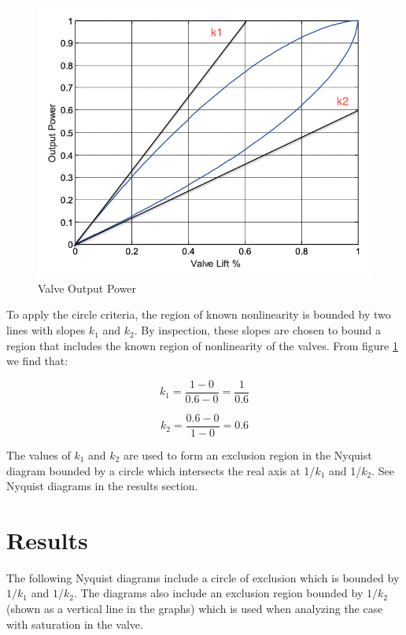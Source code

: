 \documentclass[a4paper, titlepage]{article}
\begin{document}
\begin{figure}[h!]
\center
\includegraphics[scale=0.25]{../figures/valveOutputPower.png}
\caption{Valve Output Power}
\label{fig:valvepower}
\end{figure}

To apply the circle criteria, the region of known nonlinearity is bounded by two lines with slopes $k_{1}$ and $k_{2}$.  By inspection, these slopes are chosen to bound a region that includes the known region of nonlinearity of the valves.  From figure \ref{fig:valvepower} we find that:

\begin{equation}
k_{1} = \frac{1-0}{0.6-0} = \frac{1}{0.6}
\label{equ:k1_value}
\end{equation}

\begin{equation}
k_{2} = \frac{0.6-0}{1-0} = 0.6
\label{equ:k2_value}
\end{equation}

The values of $k_{1}$ and $k_{2}$ are used to form an exclusion region in the Nyquist diagram bounded by a circle which intersects the real axis at 1/$k_{1}$ and 1/$k_{2}$.  See Nyquist diagrams in the results section.

\section{Results}

The following Nyquist diagrams include a circle of exclusion which is bounded by $1/k_{1}$ and $1/k_{2}$.  The diagrams also include an exclusion region bounded by $1/k_{2}$ (shown as a vertical line in the graphs) which is used when analyzing the case with saturation in the valve.
\end{document}
